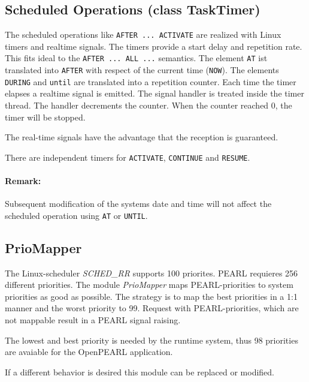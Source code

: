 \subsection{Scheduled Operations (class TaskTimer)}
The scheduled operations like \verb|AFTER ... ACTIVATE| are realized with
Linux timers and realtime signals. 
The timers provide a start delay and repetition rate. This fits ideal to
the \verb|AFTER ... ALL ...| semantics.
The element \verb|AT| ist translated into \verb|AFTER| with respect of the current
time (\verb|NOW|).
The elements \verb|DURING| and \verb|until| are translated into a repetition 
counter. Each time the timer elapses a realtime signal is emitted.
The signal handler is treated inside the timer thread.
The handler decrements the counter.
When the counter reached 0, the timer will be stopped.

The real-time signals have the advantage that the reception is guaranteed.

There are independent timers for \verb|ACTIVATE|, \verb|CONTINUE| 
and \verb|RESUME|.

\paragraph{Remark:} Subsequent modification of the systems date and time 
will not affect the scheduled operation using \verb|AT| or \verb|UNTIL|.


\subsection{PrioMapper}
The Linux-scheduler {\em SCHED\_RR} supports 100 priorites. PEARL requieres 
256 different priorities.
The module {\em PrioMapper} maps PEARL-priorities to system priorities as good
as possible. The strategy is to map the best priorities in a 1:1 manner and the
worst priority to 99. 
Request with PEARL-priorities, which are not mappable result in a PEARL
signal raising.

The lowest and best priority is needed by the runtime system, thus 98 
priorities are avaiable for the OpenPEARL application.

If a different behavior is desired this module can be replaced or modified.


